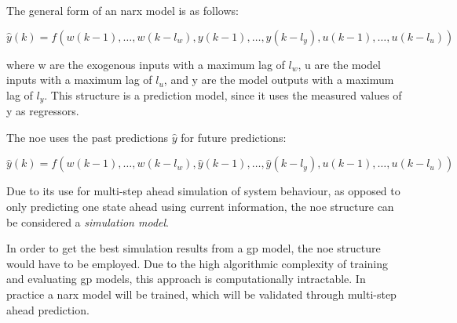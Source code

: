 The general form of an \acrfull{narx} model is as follows:

\begin{equation}
    \hat{y}(k) =
    f(w(k-1),\dots,w(k-l_w),y(k-1),\dots,y(k-l_y),u(k-1),\dots,u(k-l_u))
\end{equation}

where w are the exogenous inputs with a maximum lag of $l_w$, u are the model
inputs with a maximum lag of $l_u$, and y are the model outputs with a maximum
lag of $l_y$. This structure is a prediction model, since it uses the measured
values of y as regressors.

The \acrfull{noe} uses the past predictions $\hat{y}$ for future predictions:

\begin{equation}
    \hat{y}(k) =
    f(w(k-1),\dots,w(k-l_w),\hat{y}(k-1),\dots,\hat{y}(k-l_y),u(k-1),\dots,u(k-l_u))
\end{equation}

Due to its use for multi-step ahead simulation of system behaviour, as opposed
to only predicting one state ahead using current information, the \acrshort{noe}
structure can be considered a \textit{simulation model}.


In order to get the best simulation results from a \acrshort{gp} model, the
\acrshort{noe} structure would have to be employed. Due to the high algorithmic
complexity of training and evaluating \acrshort{gp} models, this approach is
computationally intractable. In practice a \acrshort{narx} model will be trained,
which will be validated through multi-step ahead prediction.

\clearpage
